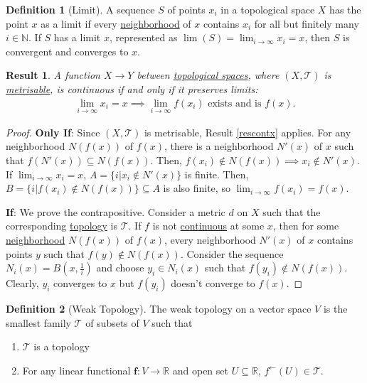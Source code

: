 \documentclass[letterpaper,12pt]{article}
\theoremstyle{plain}
\newtheorem{res}{Result}
\theoremstyle{plain}
\theoremstyle{definition}
\newtheorem{defn}{Definition}
\begin{document}
\begin{defn}[Limit]\label{deflim}
A sequence $S$ of points $x_i$ in a topological space $X$ has the point $x$ as a limit if every \hyperref[defngbr]{neighborhood} of $x$ contains $x_i$ for all but finitely many $i\in\mathbb{N}$. If $S$ has a limit $x$, represented as $\lim(S)=\lim_{i\to\infty}x_i=x$\index{$\lim$}, then $S$ is convergent and converges to $x$.
\end{defn}

\begin{res} \label{rescontlim} A function $X\rightarrow Y$ between \hyperref[deftop]{topological spaces}, where $(X,\mathcal{T})$ is \hyperref[defmetr]{metrisable}, is continuous if and only if it preserves limits:
\begin{align*}
\lim_{i\to \infty}x_i = x \implies \lim_{i\to \infty}f(x_i) \text{ exists and is } f(x).
\end{align*}
\end{res}
\begin{proof}
\textbf{Only If}: Since $(X,\mathcal{T})$ is metrisable, Result \ref{rescontx} applies. For any neighborhood $N(f(x))$ of $f(x)$, there is a neighborhood $N'(x)$ of $x$ such that $f(N'(x))\subseteq N(f(x))$. Then, $f(x_i)\not\in N(f(x)) \implies x_i \not\in N'(x)$. If $\lim_{i\to \infty}x_i = x$, $A=\{i|x_i\not\in N'(x)\}$ is finite. Then, $B=\{i|f(x_i)\not\in N(f(x))\} \subseteq A$ is also finite, so $\lim_{i\to \infty}f(x_i) = f(x)$.

\noindent \textbf{If}: We prove the contrapositive. Consider a metric $d$ on $X$ such that the corresponding \hyperref[defmtop]{topology} is $\mathcal{T}$. If $f$ is not \hyperref[deftcon]{continuous} at some $x$, then for some \hyperref[defngbr]{neighborhood} $N(f(x))$ of $f(x)$, every neighborhood $N'(x)$ of $x$ contains points $y$ such that $f(y)\notin N(f(x))$. Consider the sequence $N_i(x)=B(x,\frac{1}{i})$ and choose $y_i\in N_i(x)$ such that $f(y_i)\not\in N(f(x))$. Clearly, $y_i$ converges to $x$ but $f(y_i)$ doesn't converge to $f(x)$.
\end{proof}

\begin{defn}[Weak Topology]\label{defwtop}
The weak topology on a vector space $V$ is the smallest family $\mathcal{T}$ of subsets of $V$ such that
\begin{enumerate}
\item $\mathcal{T}$ is a topology
\item For any linear functional $\mathbf{f}:V\rightarrow \mathbb{R}$ and open set $U\subseteq \mathbb{R}$, $f^{\leftarrow}(U)\in \mathcal{T}$.
\end{enumerate}
\end{defn}
\end{document}
